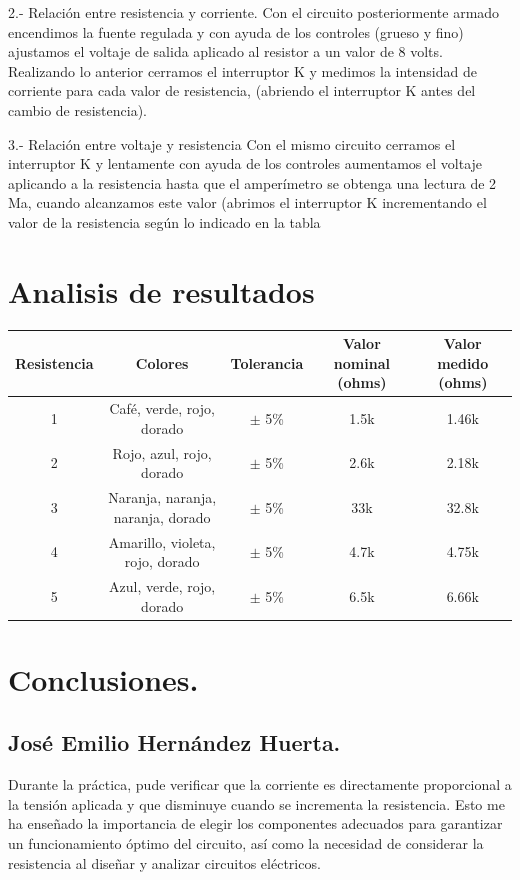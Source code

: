 \documentclass[10pt]{article}
\begin{document}
\begin{multicols}{2}
2.- Relación entre resistencia y corriente. 
Con el circuito posteriormente armado encendimos la fuente regulada y con ayuda de los controles (grueso y fino) ajustamos el voltaje de salida aplicado al resistor a un valor de 8 volts. 
Realizando lo anterior cerramos el interruptor K y medimos la intensidad de corriente para cada valor de resistencia, (abriendo el interruptor K antes del cambio de resistencia). 

3.- Relación entre voltaje y resistencia 
Con el mismo circuito cerramos el interruptor K y lentamente con ayuda de los controles aumentamos el voltaje aplicando a la resistencia hasta que el amperímetro se obtenga una lectura de 2 Ma, cuando alcanzamos este valor (abrimos el interruptor K incrementando el valor de la resistencia según lo indicado en la tabla



\section{Analisis de resultados}




\begin{center}
	\begin{adjustbox}{width=245pt}
		\begin{tabular}{|c|c|c|c|c|}
			\hline
			Resistencia & Colores & Tolerancia & Valor nominal (ohms) & Valor medido (ohms) \\
			\hline
			1 & Café, verde, rojo, dorado & $\pm$ 5\% & 1.5k & 1.46k \\
			\hline
			2 & Rojo, azul, rojo, dorado & $\pm$ 5\% & 2.6k & 2.18k \\
			\hline
			3 & Naranja, naranja, naranja, dorado & $\pm$ 5\% & 33k & 32.8k \\
			\hline
			4 & Amarillo, violeta, rojo, dorado & $\pm$ 5\% & 4.7k & 4.75k \\
			\hline
			5 & Azul, verde, rojo, dorado & $\pm$ 5\% & 6.5k & 6.66k \\
			\hline
		\end{tabular}
	\end{adjustbox}
\end{center}


\section{Conclusiones.}

\subsection*{José Emilio Hernández Huerta.}
Durante la práctica, pude verificar que la corriente es directamente proporcional a la tensión aplicada y que disminuye cuando se incrementa la resistencia. Esto me ha enseñado la importancia de elegir los componentes adecuados para garantizar un funcionamiento óptimo del circuito, así como la necesidad de considerar la resistencia al diseñar y analizar circuitos eléctricos. 


\end{multicols}
\end{document}
